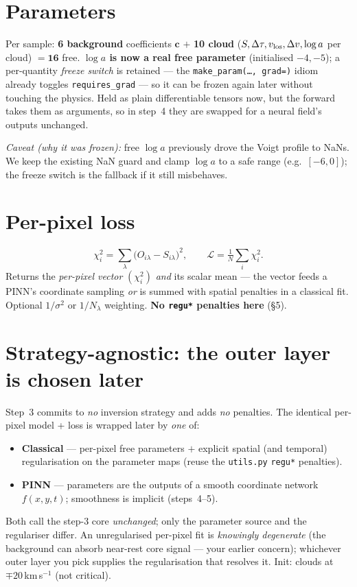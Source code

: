 \documentclass[10pt,a4paper]{article}
\newcommand{\co}[1]{{\small\texttt{#1}}}
\begin{document}
\section{Parameters}

Per sample: \textbf{6 background} coefficients $\mathbf c$ $+$ \textbf{10 cloud} ($S,\Delta\tau,v_{\rm los},\Delta v,\log a$ per cloud) $=\mathbf{16}$ free. \textbf{$\log a$ is now a real free parameter} (initialised $-4,-5$); a per-quantity \emph{freeze switch} is retained --- the \co{make\_param(\dots, grad=)} idiom already toggles \co{requires\_grad} --- so it can be frozen again later without touching the physics. Held as plain differentiable tensors now, but the forward takes them as arguments, so in step~4 they are swapped for a neural field's outputs unchanged.

\emph{Caveat (why it was frozen):} free $\log a$ previously drove the Voigt profile to NaNs. We keep the existing NaN guard and clamp $\log a$ to a safe range (e.g.\ $[-6,0]$); the freeze switch is the fallback if it still misbehaves.

\section{Per-pixel loss}

\[
\chi^2_i=\sum_\lambda\big(O_{i\lambda}-S_{i\lambda}\big)^2,\qquad
\mathcal L=\tfrac1{N}\textstyle\sum_i \chi^2_i .
\]
Returns the \emph{per-pixel vector} $(\chi^2_i)$ \emph{and} its scalar mean --- the vector feeds a PINN's coordinate sampling \emph{or} is summed with spatial penalties in a classical fit. Optional $1/\sigma^2$ or $1/N_\lambda$ weighting. \textbf{No \co{regu*} penalties here} (\S5).

\section{Strategy-agnostic: the outer layer is chosen later}

Step~3 commits to \emph{no} inversion strategy and adds \emph{no} penalties. The identical per-pixel model + loss is wrapped later by \emph{one} of:
\begin{itemize}
\item[\textbf{A}] \textbf{Classical} --- per-pixel free parameters $+$ explicit spatial (and temporal) regularisation on the parameter maps (reuse the \co{utils.py} \co{regu*} penalties).
\item[\textbf{B}] \textbf{PINN} --- parameters are the outputs of a smooth coordinate network $f(x,y,t)$; smoothness is implicit (steps~4--5).
\end{itemize}
Both call the step-3 core \emph{unchanged}; only the parameter source and the regulariser differ. An unregularised per-pixel fit is \emph{knowingly degenerate} (the background can absorb near-rest core signal --- your earlier concern); whichever outer layer you pick supplies the regularisation that resolves it. Init: clouds at $\mp20$\,km\,s$^{-1}$ (not critical).
\end{document}
